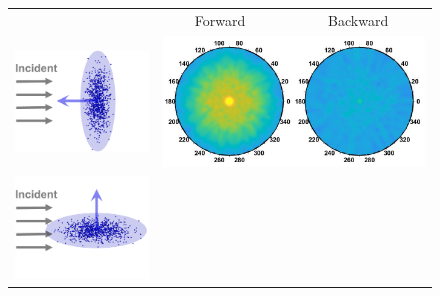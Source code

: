 \begin{figure}[t]
    \centering
    \setlength{\resLen}{1in}
    \addtolength{\tabcolsep}{-3pt}
    \small
    \begin{tabular}{ccc}
        & Forward & Backward\\
        \includegraphics[height=.9\resLen]{images/particle/aniso_z.png}
        & \multicolumn{2}{c}{\includegraphics[height=\resLen]{images/pfunc/aniso_z.png}}
        \\
        \includegraphics[height=.9\resLen]{images/particle/aniso_y.png}

\end{tabular}
\end{figure}
